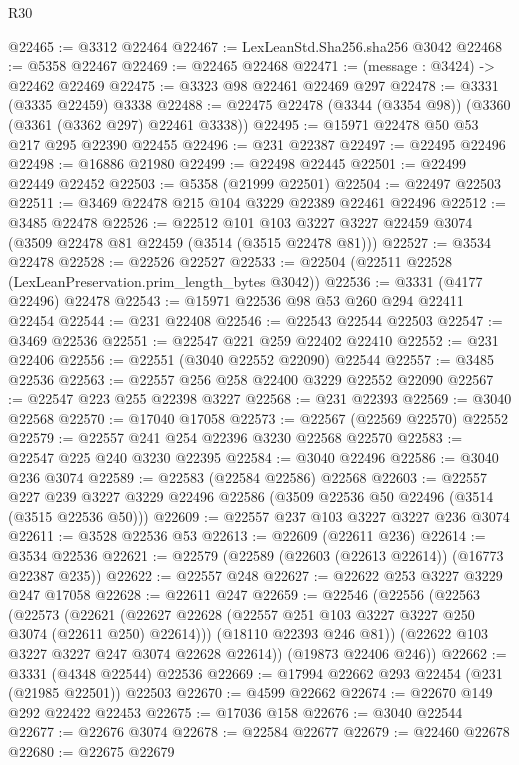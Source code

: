 \begin{lexlean}{R30}
\begin{coremodule}
@22465 := @3312 @22464
@22467 := LexLeanStd.Sha256.sha256 @3042
@22468 := @5358 @22467
@22469 := @22465 @22468
@22471 := (message : @3424) -> @22462 @22469
@22475 := @3323 @98 @22461 @22469 @297
@22478 := @3331 (@3335 @22459) @3338
@22488 := @22475 @22478 (@3344 (@3354 @98)) (@3360 (@3361 (@3362 @297) @22461 @3338))
@22495 := @15971 @22478 @50 @53 @217 @295 @22390 @22455
@22496 := @231 @22387
@22497 := @22495 @22496
@22498 := @16886 @21980
@22499 := @22498 @22445
@22501 := @22499 @22449 @22452
@22503 := @5358 (@21999 @22501)
@22504 := @22497 @22503
@22511 := @3469 @22478 @215 @104 @3229 @22389 @22461 @22496
@22512 := @3485 @22478
@22526 := @22512
    @101
    @103
    @3227
    @3227
    @22459
    @3074
    (@3509 @22478 @81 @22459 (@3514 (@3515 @22478 @81)))
@22527 := @3534 @22478
@22528 := @22526 @22527
@22533 := @22504 (@22511 @22528 (LexLeanPreservation.prim_length_bytes @3042))
@22536 := @3331 (@4177 @22496) @22478
@22543 := @15971 @22536 @98 @53 @260 @294 @22411 @22454
@22544 := @231 @22408
@22546 := @22543 @22544 @22503
@22547 := @3469 @22536
@22551 := @22547 @221 @259 @22402 @22410
@22552 := @231 @22406
@22556 := @22551 (@3040 @22552 @22090) @22544
@22557 := @3485 @22536
@22563 := @22557 @256 @258 @22400 @3229 @22552 @22090
@22567 := @22547 @223 @255 @22398 @3227
@22568 := @231 @22393
@22569 := @3040 @22568
@22570 := @17040 @17058
@22573 := @22567 (@22569 @22570) @22552
@22579 := @22557 @241 @254 @22396 @3230 @22568 @22570
@22583 := @22547 @225 @240 @3230 @22395
@22584 := @3040 @22496
@22586 := @3040 @236 @3074
@22589 := @22583 (@22584 @22586) @22568
@22603 := @22557
    @227
    @239
    @3227
    @3229
    @22496
    @22586
    (@3509 @22536 @50 @22496 (@3514 (@3515 @22536 @50)))
@22609 := @22557 @237 @103 @3227 @3227 @236 @3074
@22611 := @3528 @22536 @53
@22613 := @22609 (@22611 @236)
@22614 := @3534 @22536
@22621 := @22579 (@22589 (@22603 (@22613 @22614)) (@16773 @22387 @235))
@22622 := @22557 @248
@22627 := @22622 @253 @3227 @3229 @247 @17058
@22628 := @22611 @247
@22659 := @22546
    (@22556
      (@22563
        (@22573
          (@22621 (@22627 @22628 (@22557 @251 @103 @3227 @3227 @250 @3074 (@22611 @250) @22614)))
          (@18110 @22393 @246 @81))
        (@22622 @103 @3227 @3227 @247 @3074 @22628 @22614))
      (@19873 @22406 @246))
@22662 := @3331 (@4348 @22544) @22536
@22669 := @17994 @22662 @293 @22454 (@231 (@21985 @22501)) @22503
@22670 := @4599 @22662
@22674 := @22670 @149 @292 @22422 @22453
@22675 := @17036 @158
@22676 := @3040 @22544
@22677 := @22676 @3074
@22678 := @22584 @22677
@22679 := @22460 @22678
@22680 := @22675 @22679

\end{coremodule}
\end{lexlean}
